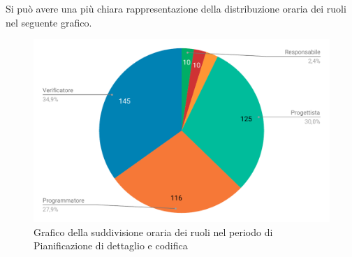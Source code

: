 Si può avere una più chiara rappresentazione della distribuzione oraria dei ruoli nel seguente grafico.

\begin{figure}[H]
	\includegraphics[width=1\linewidth]{Preventivo/grafici/PC2.pdf}
	\caption{Grafico della suddivisione oraria dei ruoli nel periodo di Pianificazione di dettaglio e codifica}
\end{figure}

